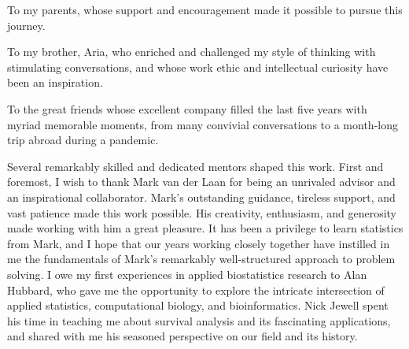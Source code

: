 \documentclass{ucbthesis}
\begin{document}


\maketitle
\copyrightpage



\begin{frontmatter}

\begin{dedication}
\null\vfil
\begin{center}
\vspace{12pt}

To my parents, whose support and encouragement made it possible to pursue this
journey.

\vspace{20pt}

To my brother, Aria, who enriched and challenged my style of thinking with
stimulating conversations, and whose work ethic and intellectual curiosity have
been an inspiration.

\vspace{20pt}

To the great friends whose excellent company filled the last five years with
myriad memorable moments, from many convivial conversations to a month-long trip
abroad during a pandemic.

\end{center}
\vfil\null
\end{dedication}


\tableofcontents
\clearpage
\listoffigures
\clearpage
\listoftables

\begin{acknowledgements}

Several remarkably skilled and dedicated mentors shaped this work. First and
foremost, I wish to thank Mark van der Laan for being an unrivaled advisor and
an inspirational collaborator. Mark's outstanding guidance, tireless support,
and vast patience made this work possible. His creativity, enthusiasm, and
generosity made working with him a great pleasure. It has been a privilege to
learn statistics from Mark, and I hope that our years working closely together
have instilled in me the fundamentals of Mark's remarkably well-structured
approach to problem solving. I owe my first experiences in applied biostatistics
research to Alan Hubbard, who gave me the opportunity to explore the intricate
intersection of applied statistics, computational biology, and bioinformatics.
Nick Jewell spent his time in teaching me about survival analysis and its
fascinating applications, and shared with me his seasoned perspective on our
field and its history.


\end{acknowledgements}
\end{frontmatter}
\end{document}
